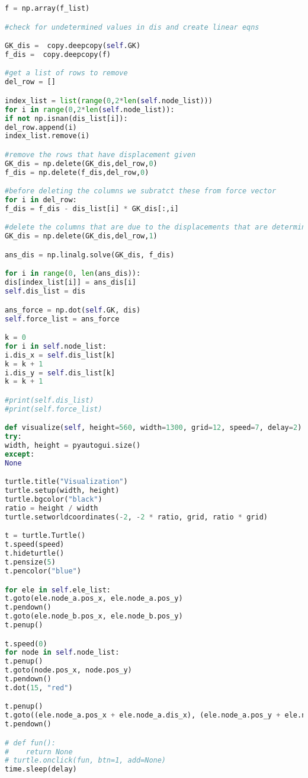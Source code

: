 \begin{lstlisting}[language=Python , basicstyle=\linespread{0.75}\listingsfont]
f = np.array(f_list)

#check for undetermined values in dis and create linear eqns

GK_dis =  copy.deepcopy(self.GK)
f_dis =  copy.deepcopy(f)

#get a list of rows to remove
del_row = []

index_list = list(range(0,2*len(self.node_list)))
for i in range(0,2*len(self.node_list)):
if not np.isnan(dis_list[i]):
del_row.append(i)
index_list.remove(i)

#remove the rows that have displacement given
GK_dis = np.delete(GK_dis,del_row,0)
f_dis = np.delete(f_dis,del_row,0)

#before deleting the columns we subratct these from force vector
for i in del_row:
f_dis = f_dis - dis_list[i] * GK_dis[:,i]

#delete the columns that are due to the displacements that are determined
GK_dis = np.delete(GK_dis,del_row,1)   

ans_dis = np.linalg.solve(GK_dis, f_dis)

for i in range(0, len(ans_dis)):
dis[index_list[i]] = ans_dis[i]
self.dis_list = dis

ans_force = np.dot(self.GK, dis)
self.force_list = ans_force

k = 0
for i in self.node_list:
i.dis_x = self.dis_list[k]
k = k + 1
i.dis_y = self.dis_list[k]
k = k + 1

#print(self.dis_list)
#print(self.force_list)

def visualize(self, height=560, width=1300, grid=12, speed=7, delay=2):
try:
width, height = pyautogui.size()
except:
None

turtle.title("Visualization")
turtle.setup(width, height)
turtle.bgcolor("black")
ratio = height / width
turtle.setworldcoordinates(-2, -2 * ratio, grid, ratio * grid)

t = turtle.Turtle()
t.speed(speed)
t.hideturtle()
t.pensize(5)
t.pencolor("blue")

for ele in self.ele_list:
t.goto(ele.node_a.pos_x, ele.node_a.pos_y)
t.pendown()
t.goto(ele.node_b.pos_x, ele.node_b.pos_y)
t.penup()

t.speed(0)
for node in self.node_list:
t.penup()
t.goto(node.pos_x, node.pos_y)
t.pendown()
t.dot(15, "red")

t.penup()
t.goto((ele.node_a.pos_x + ele.node_a.dis_x), (ele.node_a.pos_y + ele.node_a.dis_y))
t.pendown()

# def fun():
#    return None 
# turtle.onclick(fun, btn=1, add=None)
time.sleep(delay)


\end{lstlisting}
